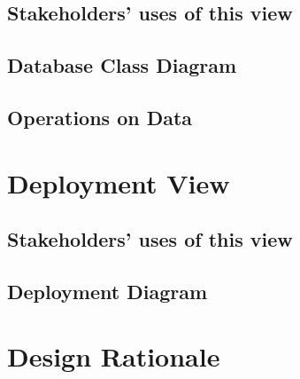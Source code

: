 \subsection{Stakeholders' uses of this view}

\subsection{Database Class Diagram}

\subsection{Operations on Data}

\section{Deployment View}

\subsection{Stakeholders' uses of this view}

\subsection{Deployment Diagram}

\section{Design Rationale}